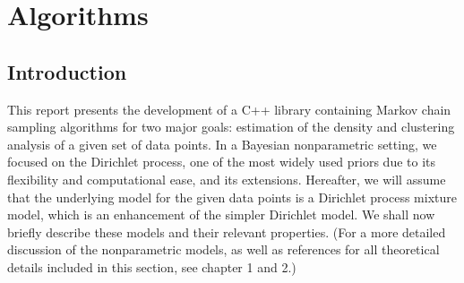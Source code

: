 \part{Algorithms}

\chapter{Introduction}
This report presents the development of a C++ library containing Markov chain sampling algorithms for two major goals: estimation of the density and clustering analysis of a given set of data points.
In a Bayesian nonparametric setting, we focused on the Dirichlet process, one of the most widely used priors due to its flexibility and computational ease, and its extensions.
Hereafter, we will assume that the underlying model for the given data points is a Dirichlet process mixture model, which is an enhancement of the simpler Dirichlet model.
We shall now briefly describe these models and their relevant properties.
(For a more detailed discussion of the nonparametric models, as well as references for all theoretical details included in this section, see \cite{book} chapter 1 and 2.)

